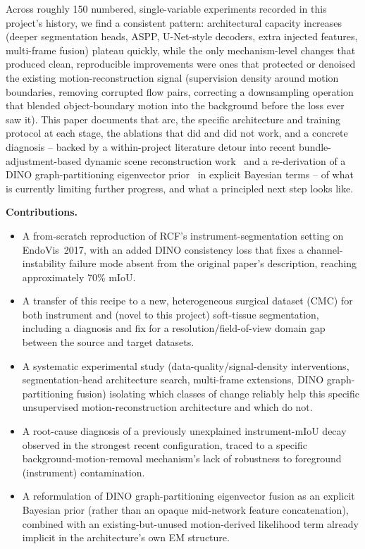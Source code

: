 \documentclass[conference]{IEEEtran}
\begin{document}
Across roughly 150 numbered, single-variable experiments recorded in this
project's history, we find a consistent pattern: architectural capacity
increases (deeper segmentation heads, ASPP, U-Net-style decoders, extra
injected features, multi-frame fusion) plateau quickly, while the only
mechanism-level changes that produced clean, reproducible improvements
were ones that protected or denoised the existing motion-reconstruction
signal (supervision density around motion boundaries, removing corrupted
flow pairs, correcting a downsampling operation that blended
object-boundary motion into the background before the loss ever saw it).
This paper documents that arc, the specific architecture and training
protocol at each stage, the ablations that did and did not work, and a
concrete diagnosis -- backed by a within-project literature detour into
recent bundle-adjustment-based dynamic scene reconstruction
work~\cite{batrack2025} and a re-derivation of a DINO
graph-partitioning eigenvector prior~\cite{graphpartition_mchm2024} in
explicit Bayesian terms -- of what is currently limiting further
progress, and what a principled next step looks like.

\textbf{Contributions.}
\begin{itemize}
\item A from-scratch reproduction of RCF's instrument-segmentation
setting on EndoVis~2017, with an added DINO consistency loss that fixes a
channel-instability failure mode absent from the original paper's
description, reaching approximately 70\% mIoU.
\item A transfer of this recipe to a new, heterogeneous surgical dataset
(CMC) for both instrument and (novel to this project) soft-tissue
segmentation, including a diagnosis and fix for a resolution/field-of-view
domain gap between the source and target datasets.
\item A systematic experimental study (data-quality/signal-density
interventions, segmentation-head architecture search, multi-frame
extensions, DINO graph-partitioning fusion) isolating which classes of
change reliably help this specific unsupervised motion-reconstruction
architecture and which do not.
\item A root-cause diagnosis of a previously unexplained instrument-mIoU
decay observed in the strongest recent configuration, traced to a
specific background-motion-removal mechanism's lack of robustness to
foreground (instrument) contamination.
\item A reformulation of DINO graph-partitioning eigenvector fusion as an
explicit Bayesian prior (rather than an opaque mid-network feature
concatenation), combined with an existing-but-unused motion-derived
likelihood term already implicit in the architecture's own EM structure.
\end{itemize}
\end{document}
